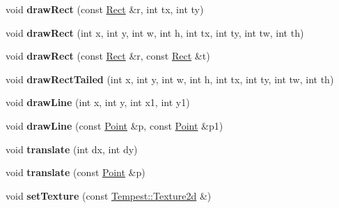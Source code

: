 \begin{DoxyCompactItemize}
\item 
\hypertarget{class_tempest_1_1_painter_a0c257320c541dd4defef195a6a23a00a}{void {\bfseries draw\+Rect} (const \hyperlink{struct_tempest_1_1_rect}{Rect} \&r, int tx, int ty)}\label{class_tempest_1_1_painter_a0c257320c541dd4defef195a6a23a00a}

\item 
\hypertarget{class_tempest_1_1_painter_a0c88edc12220c959975ed29269d620a8}{void {\bfseries draw\+Rect} (int x, int y, int w, int h, int tx, int ty, int tw, int th)}\label{class_tempest_1_1_painter_a0c88edc12220c959975ed29269d620a8}

\item 
\hypertarget{class_tempest_1_1_painter_a20abbe6901dd65ccfa89a2b1438ed678}{void {\bfseries draw\+Rect} (const \hyperlink{struct_tempest_1_1_rect}{Rect} \&r, const \hyperlink{struct_tempest_1_1_rect}{Rect} \&t)}\label{class_tempest_1_1_painter_a20abbe6901dd65ccfa89a2b1438ed678}

\item 
\hypertarget{class_tempest_1_1_painter_aad5a90493c81989649070cf34b07ac35}{void {\bfseries draw\+Rect\+Tailed} (int x, int y, int w, int h, int tx, int ty, int tw, int th)}\label{class_tempest_1_1_painter_aad5a90493c81989649070cf34b07ac35}

\item 
\hypertarget{class_tempest_1_1_painter_a363ef17a7ad27de08b9d1f595a5a0a56}{void {\bfseries draw\+Line} (int x, int y, int x1, int y1)}\label{class_tempest_1_1_painter_a363ef17a7ad27de08b9d1f595a5a0a56}

\item 
\hypertarget{class_tempest_1_1_painter_a1bd57dd2715f4ca5a98bea6aeb0d2b74}{void {\bfseries draw\+Line} (const \hyperlink{struct_tempest_1_1_point}{Point} \&p, const \hyperlink{struct_tempest_1_1_point}{Point} \&p1)}\label{class_tempest_1_1_painter_a1bd57dd2715f4ca5a98bea6aeb0d2b74}

\item 
\hypertarget{class_tempest_1_1_painter_ac13210835bec2c614e3f4a72ca9f9355}{void {\bfseries translate} (int dx, int dy)}\label{class_tempest_1_1_painter_ac13210835bec2c614e3f4a72ca9f9355}

\item 
\hypertarget{class_tempest_1_1_painter_a15062ee643c9a9a122d204bff8adf766}{void {\bfseries translate} (const \hyperlink{struct_tempest_1_1_point}{Point} \&p)}\label{class_tempest_1_1_painter_a15062ee643c9a9a122d204bff8adf766}

\item 
\hypertarget{class_tempest_1_1_painter_a62ba7a55339b591c7844e809c6dbe44f}{void {\bfseries set\+Texture} (const \hyperlink{class_tempest_1_1_texture2d}{Tempest\+::\+Texture2d} \&)}\label{class_tempest_1_1_painter_a62ba7a55339b591c7844e809c6dbe44f}


\end{DoxyCompactItemize}
